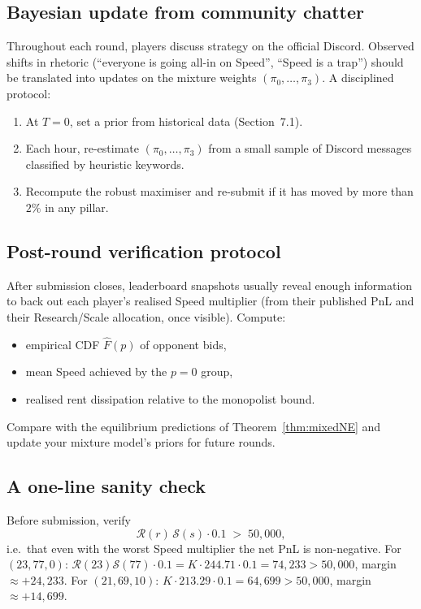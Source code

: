 \documentclass[11pt,a4paper]{article}
\theoremstyle{definition}
\theoremstyle{remark}
\newcommand{\R}{\mathcal{R}}
\newcommand{\Sc}{\mathcal{S}}
\begin{document}
\subsection{Bayesian update from community chatter}
Throughout each round, players discuss strategy on the official Discord.
Observed shifts in rhetoric (``everyone is going all-in on Speed'',
``Speed is a trap'') should be translated into updates on the mixture weights
\((\pi_0,\ldots,\pi_3)\). A disciplined protocol:
\begin{enumerate}[leftmargin=*,itemsep=2pt]
  \item At \(T=0\), set a prior from historical data (Section~7.1).
  \item Each hour, re-estimate \((\pi_0,\ldots,\pi_3)\) from a small sample of
  Discord messages classified by heuristic keywords.
  \item Recompute the robust maximiser and re-submit if it has moved by more
  than \(2\%\) in any pillar.
\end{enumerate}

\subsection{Post-round verification protocol}
After submission closes, leaderboard snapshots usually reveal enough
information to back out each player's realised Speed multiplier (from their
published PnL and their Research/Scale allocation, once visible). Compute:
\begin{itemize}[leftmargin=*,itemsep=2pt]
  \item empirical CDF \(\hat F(p)\) of opponent bids,
  \item mean Speed achieved by the \(p=0\) group,
  \item realised rent dissipation relative to the monopolist bound.
\end{itemize}
Compare with the equilibrium predictions of Theorem~\ref{thm:mixedNE} and
update your mixture model's priors for future rounds.

\subsection{A one-line sanity check}
Before submission, verify
\[
\R(r)\,\Sc(s)\cdot 0.1\;>\;50{,}000,
\]
i.e.\ that even with the worst Speed multiplier the net PnL is non-negative.
For \((23,77,0)\): \(\R(23)\Sc(77)\cdot 0.1 = K\cdot 244.71\cdot 0.1
=74{,}233>50{,}000\), margin \(\approx +24{,}233\). \checkmark For
\((21,69,10)\): \(K\cdot 213.29\cdot 0.1=64{,}699>50{,}000\), margin
\(\approx +14{,}699\). \checkmark
\end{document}
